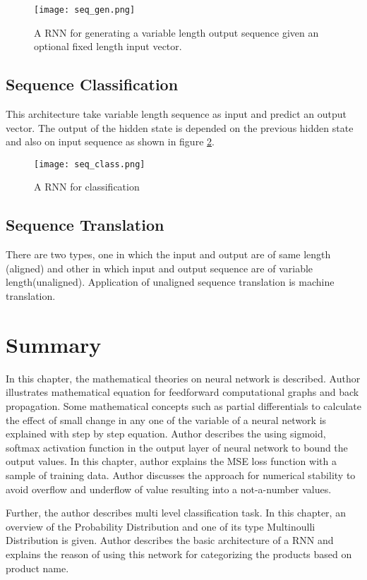     \begin{figure}[H]
        \centering    
        \texttt{[image: seq\_gen.png]}
        \caption{A \acl*{RNN} for generating a variable length output sequence given an
        optional fixed length input vector. \parencite[section 15.2.1]{pml1Book}}
        \label{fig:RNN vectoseq}
    \end{figure}

    \subsection*{Sequence Classification}
This architecture take variable length sequence as input and predict an output vector. The output of the hidden state is depended on the previous hidden state and also on input sequence as shown in figure \ref{fig:RNN seqtovec}.
    \begin{figure}[H]
        \centering    
        \texttt{[image: seq\_class.png]}
        \caption{A \acs*{RNN} for classification \parencite[section 15.2.1]{pml1Book}}
        \label{fig:RNN seqtovec}
    \end{figure}



    \subsection*{Sequence Translation}
There are two types, one in which the input and output are of same length (aligned) and other in which input and output sequence are of variable length(unaligned). 
Application of unaligned sequence translation is machine translation.     
    
    






\section{Summary}

In this chapter, the mathematical theories on neural network is described. Author illustrates mathematical equation for feedforward computational graphs and back propagation. Some mathematical concepts such as partial differentials to calculate the effect of small change in any one of the variable of a neural network is explained with step by step equation. Author describes the using sigmoid, softmax activation function in the output layer of neural network to bound the output values. In this chapter, author explains the \acl{MSE} loss function with a sample of training data. Author discusses the approach for numerical stability to avoid overflow and underflow of value resulting into a not-a-number values.

Further, the author describes multi level classification task.  In this chapter, an overview of the Probability Distribution and one of its type Multinoulli Distribution is given. Author describes the basic architecture of a \acl{RNN} and explains the reason of using this network for categorizing the products based on product name.  